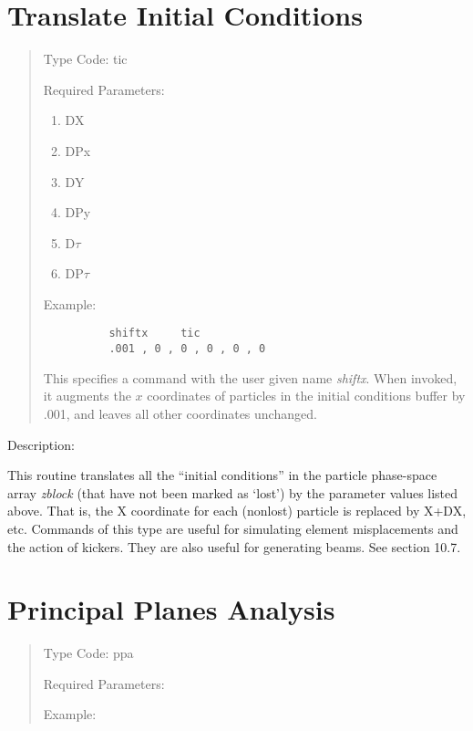 \section{Translate Initial Conditions}  
\begin{quotation}
\noindent Type Code:  tic
\vspace{5mm}

\noindent Required Parameters:
\begin{enumerate}

\item  DX
\item  DPx
\item  DY
\item  DPy
\item  D$\tau$
\item  DP$\tau$

\end{enumerate}

\vspace{5mm}
\noindent Example:
\begin{verbatim}
          shiftx     tic
          .001 , 0 , 0 , 0 , 0 , 0
\end{verbatim}
This specifies a command with the user given name {\em shiftx}. When invoked, it augments the $x$ coordinates of particles in the initial conditions buffer by .001, and leaves all other coordinates unchanged.
\end{quotation}

\vspace{5mm}
Description:
\vspace{2mm}

This routine translates all the ``initial conditions'' in the particle phase-space array {\em
zblock} (that have not been marked as `lost') by the parameter values
listed above.  That is, the X coordinate for each (nonlost) particle is
replaced by X+DX, etc.  Commands of this type are useful for simulating element misplacements and the action of kickers.  They are also useful for generating beams.  See section 10.7.

\newpage
\section{Principal Planes Analysis} 
\begin{quotation}
\noindent Type Code:  ppa
\vspace{5mm}

\noindent Required Parameters:



\vspace{5mm}
\noindent Example:
\end{quotation}

